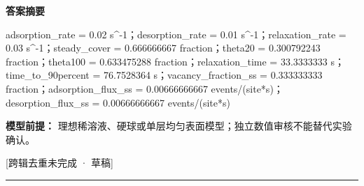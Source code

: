 \documentclass[UTF8,11pt,a4paper]{ctexart}
\begin{document}
\noindent\textbf{答案摘要}\par
adsorption\_rate = 0.02 s\textasciicircum{}-1；desorption\_rate = 0.01 s\textasciicircum{}-1；relaxation\_rate = 0.03 s\textasciicircum{}-1；steady\_cover = 0.666666667 fraction；theta20 = 0.300792243 fraction；theta100 = 0.633475288 fraction；relaxation\_time = 33.3333333 s；time\_to\_90percent = 76.7528364 s；vacancy\_fraction\_ss = 0.333333333 fraction；adsorption\_flux\_ss = 0.00666666667 events/(site*s)；desorption\_flux\_ss = 0.00666666667 events/(site*s)\par
\noindent\textbf{模型前提：}
理想稀溶液、硬球或单层均匀表面模型；独立数值审核不能替代实验确认。\par
\noindent\textcolor{red!65!black}{[跨辑去重未完成 · 草稿]} \par
\medskip\hrule\medskip
\end{document}
